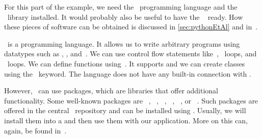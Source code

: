 For this part of the example, we need the \python\ programming language and the \psycopg~library installed.
It would probably also be useful to have the \pycharm\  ready.
How these pieces of software can be obtained is discussed in \cref{sec:pythonEtAl} and in~\cite{programmingWithPython}.

\python\ is a programming language.
It allows us to write arbitrary programs using datatypes such as , , and~.
We can use control flow statements like~, ~loops, and ~loops.
We can define functions using~.
It supports  and we can create classes using the ~keyword.
The language does not have any built-in connection with \postgresql.

However, \python\ can use packages, which are libraries that offer additional functionality.
Some well-known packages are \numpy~\cite{HMvdWGVCWTBSKPHvKBHFdRWPGMSRWAGO2020APWN,N2025N,DBvR2024ITN,J2018NPSCADSAWNSAM}, \pandas~\cite{PD2025P,B2012DPWP,L2024PW}, \scikitlearn~\cite{PVGMTGBPWDVPCBPD2011SMLIP,RLM2022MLWPAS}, \scipy~\cite{VGOHRCBPWBvdWBWMMNJKLCPFMVLPCHQHARPvMS2020SFAFSCIP,J2018NPSCADSAWNSAM}, \tensorflow~\cite{ABCCDDDGIIKLMMMSTVWWYZ2016TASFLSML,L2023TDDBTADMLMWT}, or \pytorch~\cite{PGMLBCKLGADKYDRTCSFBC2019PAISHPDLL,RLM2022MLWPAS}.
Such packages are offered in the central \pypi\ repository and can be installed using \pip.
Usually, we will install them into a  and then use them with our application.
More on this can, again, be found in~\cite{programmingWithPython}.

